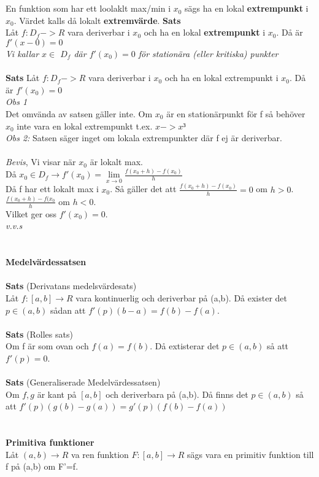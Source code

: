 \documentclass{article}
\begin{document}
	\\\\
	En funktion som har ett loolaklt max/min i $x_0$ sägs ha en lokal \textbf{extrempunkt} i $x_0$. Värdet kalls då lokalt \textbf{extremvärde}. 
	\textbf{Sats} \\
	Låt $f:D_f -> R$ vara deriverbar i $x_0$ och ha en lokal \textbf{extrempunkt} i $x_0$. Då är $f'(x-0)=0$\\
	\textit{Vi kallar $x\in$ $D_f$ där $f'(x_0)=0$ för stationära (eller kritiska) punkter}
	\\\\
	\textbf{Sats} Låt $f:D_f -> R$ vara deriverbar i $x_0$ och ha en lokal extrempunkt i $x_0$. Då är $f'(x_0)=0$ \\
	\textit{Obs 1}\\ 
	Det omvända av satsen gäller inte. Om $x_0$ är en stationärpunkt för f så behöver $x_0$ inte vara en lokal extrempunkt t.ex. $x -> x³$ 
	\\
	\textit{Obs 2: } 
	Satsen säger inget om lokala extrempunkter där f ej är deriverbar. 
	\\\\
	\textit{Bevis}, Vi visar när $x_0$ är lokalt max.
	\\
	Då $x_0\in D_f\to f'(x_0)=\lim\limits_{x\to 0}\frac{f(x_0 + h )-f(x_0)}{h}$ 
	\\
	Då f har ett lokalt max i $x_0$. Så gäller det att $\frac{f(x_0 +h) - f(x_0)}{h} = 0$ om $h > 0$. 
	\\
	$\frac{f(x_0 +h)-f(x_0}{h}$ om $h < 0$.
	\\
	Vilket ger oss $f'(x_0)=0$. \\
	\textit{v.v.s}
	\\\\\\
	\textbf{Medelvärdessatsen}
	\\\\
	\textbf{Sats} (Derivatans medelsvärdesats) \\
	Låt $f:[a,b]\to R$ vara kontinuerlig och deriverbar på (a,b). Då exister det $p\in (a,b)$ sådan att $f'(p)(b-a)=f(b)-f(a)$.
	\\\\
	\textbf{Sats} (Rolles sats) \\
	Om f är som ovan och $f(a) = f(b)$. Då extisterar det $p\in (a,b)$ så att $f'(p) = 0$.
	\\\\
	\textbf{Sats} (Generaliserade Medelvärdessatsen)
	\\
	Om $f,g$ är kant på $[a,b]$ och deriverbara på (a,b). Då finns det $p\in (a,b)$ så att $ f'(p)(g(b)-g(a)) = g'(p)(f(b)-f(a))$
	\\\\\\
	\textbf{Primitiva funktioner} \\
	Låt $(a,b)\to R$ va ren funktion $F:[a,b]\to R$ sägs vara en primitiv funktion till f på (a,b) om F'=f.
	\\\\
\end{document}
